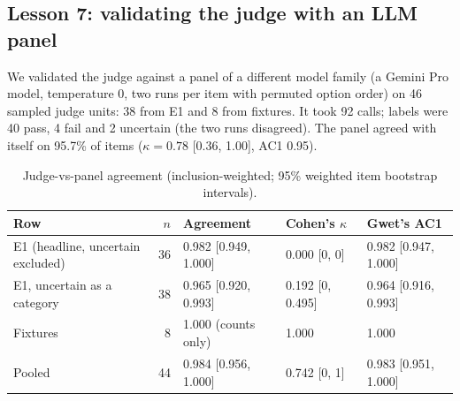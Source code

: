 \documentclass[10pt,a4paper]{article}
\begin{document}
\subsection{Lesson 7: validating the judge with an LLM panel}\label{sec:l7}

We validated the judge against a panel of a different model family (a Gemini Pro model, temperature 0, two runs
per item with permuted option order) on 46 sampled judge units: 38 from E1 and 8 from fixtures. It took 92 calls; labels
were 40 pass, 4 fail and 2 uncertain (the two runs disagreed).
The panel agreed with itself on 95.7\% of items ($\kappa = 0.78$ [0.36, 1.00], AC1 0.95).

\begin{table}[t]
\centering
\small
\caption{Judge-vs-panel agreement (inclusion-weighted; 95\% weighted item bootstrap intervals).}
\label{tab:p4}
\begin{tabular}{@{}lrlll@{}}
\toprule
Row & $n$ & Agreement & Cohen's $\kappa$ & Gwet's AC1 \\
\midrule
E1 (headline, uncertain excluded)  & 36 & 0.982 [0.949, 1.000] & 0.000 [0, 0]      & 0.982 [0.947, 1.000] \\
E1, uncertain as a category        & 38 & 0.965 [0.920, 0.993] & 0.192 [0, 0.495]  & 0.964 [0.916, 0.993] \\
Fixtures                           &  8 & 1.000 (counts only)  & 1.000             & 1.000 \\
Pooled                             & 44 & 0.984 [0.956, 1.000] & 0.742 [0, 1]      & 0.983 [0.951, 1.000] \\
\bottomrule
\end{tabular}
\end{table}
\end{document}
